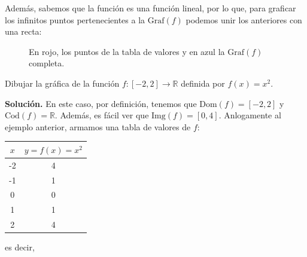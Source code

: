 Además, sabemos que la función es una función lineal, por lo que, para graficar los infinitos puntos pertenecientes
    a la $\text{Graf}(f)$  podemos unir los anteriores con una recta:
    \begin{figure}[H] 
        \begin{center}
            \end{center}
        \caption{En rojo, los puntos de la tabla de valores y en azul la $\text{Graf}(f)$ completa.}
    \end{figure}

 
\begin{example} Dibujar la gráfica de la función $f \colon [-2,2] \to \mathbb{R}$ definida por $f(x) = x^2$.
 \end{example}
{\textbf{Solución.}}  En este caso, por definici\'on,  tenemos que $\text{Dom}(f)=  [-2,2]$ y $\text{Cod}(f)=  \mathbb{R}$. Adem\'as, es f\'acil ver que $\text{Img}(f)= [0,4].$  Anlogamente al ejemplo anterior,  armamos una tabla de valores de $f$:
    \begin{table}[H]
        \centering
        \begin{tabular}{|c|c|}
            \hline
            $x$ & $y=f(x)=x^2$ \\ \hline
            -2  & 4        \\ \hline
            -1  & 1        \\ \hline
            0   & 0        \\ \hline
            1   & 1        \\ \hline
            2   & 4        \\ \hline
            \end{tabular}
      \end{table} es decir, 
     
